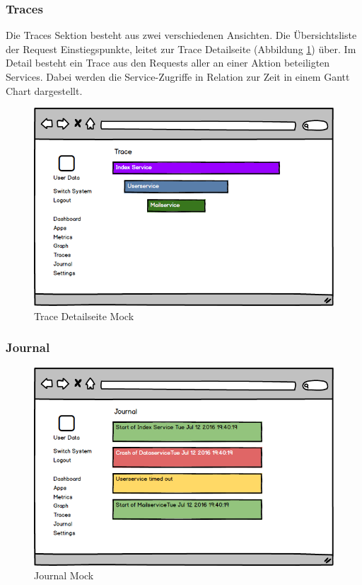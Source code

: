 \subsubsection{Traces}

Die Traces Sektion besteht aus zwei verschiedenen Ansichten. Die Übersichtsliste der Request Einstiegspunkte,
leitet zur Trace Detailseite (Abbildung \ref{fig:trace}) über. Im Detail besteht ein Trace aus den Requests
aller an einer Aktion beteiligten Services. Dabei werden die Service-Zugriffe in Relation zur Zeit in einem Gantt Chart dargestellt.

\vspace{0.3cm}
\begin{figure}[h]
 \centering
 \includegraphics[width=0.7\linewidth]{kapitel1/mocks/trace.png}
 \caption{Trace Detailseite Mock}
 \label{fig:trace}
\end{figure}


\subsubsection{Journal}

\begin{figure}[h]
 \centering
 \includegraphics[width=0.7\linewidth]{kapitel1/mocks/journal.png}
 \caption{Journal Mock}
 \label{fig:journalmock}
\end{figure}

